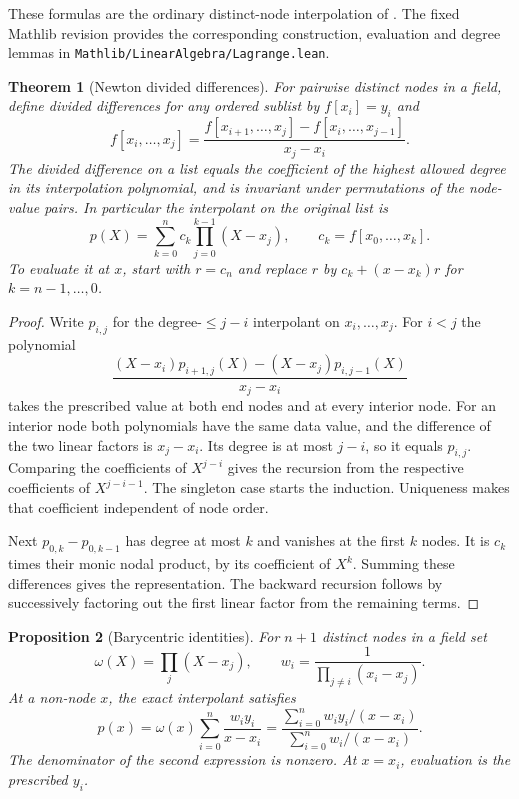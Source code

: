\documentclass[11pt,oneside,openany]{book}
\theoremstyle{plain}
\newtheorem{theorem}{Theorem}[chapter]
\newtheorem{proposition}[theorem]{Proposition}
\theoremstyle{definition}
\theoremstyle{remark}
\begin{document}
These formulas are the ordinary distinct-node interpolation of
\cite[Section 2.1.1]{stoer}. The fixed Mathlib revision
\cite{mathlib} provides the corresponding construction, evaluation
and degree lemmas in \texttt{Mathlib/LinearAlgebra/Lagrange.lean}.

\begin{theorem}[Newton divided differences]\label{p206:W48}
For pairwise distinct nodes in a field, define divided differences
for any ordered sublist by \(f[x_i]=y_i\) and
\[
 f[x_i,\ldots,x_j]
 =\frac{f[x_{i+1},\ldots,x_j]-f[x_i,\ldots,x_{j-1}]}{x_j-x_i}.
\]
The divided difference on a list equals the coefficient of the
highest allowed degree in its interpolation polynomial, and is
invariant under permutations of the node-value pairs. In
particular the interpolant on the original list is
\[
 p(X)=\sum_{k=0}^n c_k\prod_{j=0}^{k-1}(X-x_j),
 \qquad c_k=f[x_0,\ldots,x_k].
\]
To evaluate it at \(x\), start with \(r=c_n\) and replace
\(r\) by \(c_k+(x-x_k)r\) for \(k=n-1,\ldots,0\).
\end{theorem}

\begin{proof}
Write \(p_{i,j}\) for the degree-\(\le j-i\) interpolant on
\(x_i,\ldots,x_j\). For \(i<j\) the polynomial
\[
 \frac{(X-x_i)p_{i+1,j}(X)-(X-x_j)p_{i,j-1}(X)}{x_j-x_i}
\]
takes the prescribed value at both end nodes and at every
interior node. For an interior node both polynomials have the
same data value, and the difference of the two linear factors
is \(x_j-x_i\). Its degree is at most \(j-i\), so it equals
\(p_{i,j}\). Comparing the coefficients of \(X^{j-i}\)
gives the recursion from the respective coefficients of
\(X^{j-i-1}\). The singleton case starts the induction.
Uniqueness makes that coefficient independent of node order.

Next \(p_{0,k}-p_{0,k-1}\) has degree at most \(k\) and
vanishes at the first \(k\) nodes. It is \(c_k\) times their
monic nodal product, by its coefficient of \(X^k\).
Summing these differences gives the representation. The backward
recursion follows by successively factoring out the first
linear factor from the remaining terms.
\end{proof}

\begin{proposition}[Barycentric identities]\label{p206:W49}
For \(n+1\) distinct nodes in a field set
\[
 \omega(X)=\prod_j(X-x_j),\qquad
 w_i=\frac{1}{\prod_{j\ne i}(x_i-x_j)}.
\]
At a non-node \(x\), the exact interpolant satisfies
\[
 p(x)=\omega(x)\sum_{i=0}^n\frac{w_i y_i}{x-x_i}
     =\frac{\displaystyle\sum_{i=0}^n w_i y_i/(x-x_i)}
             {\displaystyle\sum_{i=0}^n w_i/(x-x_i)}.
\]
The denominator of the second expression is nonzero.
At \(x=x_i\), evaluation is the prescribed \(y_i\).
\end{proposition}
\end{document}
